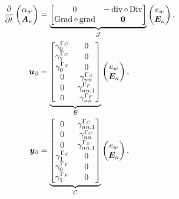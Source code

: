 \begin{equation}\label{eq:phsysKir}
\begin{aligned}
\displaystyle
\diffp{}{t}
\begin{pmatrix}
\alpha_w \\
\bm{A}_{\kappa} \\
\end{pmatrix} &= 
\underbrace{\begin{bmatrix}
	0  &  - \div \circ \Div \\
\Grad \circ \grad & \bm{0} \\
\end{bmatrix}}_{\mathcal{J}}
\begin{pmatrix}
e_w \\
\bm{E}_{\kappa} \\
\end{pmatrix}, \vspace{3pt}\\
\bm{u}_\partial &= \underbrace{
	\begin{bmatrix}
	\gamma_{0}^{\Gamma_C} & {0}  \\
	\gamma_1^{\Gamma_C} &  {0} \\
	\gamma_{0}^{\Gamma_S} &  {0}  \\
	{0} & \gamma_{nn}^{\Gamma_S} \\
	{0} & \gamma_{nn, 1}^{\Gamma_F}  \\
	{0} & \gamma_{nn}^{\Gamma_F}\\
	\end{bmatrix}}_{\mathcal{B}} \begin{pmatrix}
e_w \\
\bm{E}_{\kappa} \\
\end{pmatrix}, \vspace{3pt}\\
\bm{y}_\partial &= \underbrace{
	\begin{bmatrix}
	{0} & \gamma_{nn, 1}^{\Gamma_C} \\
	{0} & \gamma_{nn}^{\Gamma_C} \\
	{0} & \gamma_{nn, 1}^{\Gamma_S} \\
	\gamma_{1}^{\Gamma_S} & {0} \\
	\gamma_{0}^{\Gamma_F} & {0} \\
	\gamma_{1}^{\Gamma_F} & {0} \\
	\end{bmatrix}}_{\mathcal{C}}
\begin{pmatrix}
e_w \\
\bm{E}_{\kappa} \\
\end{pmatrix},
\end{aligned}
\end{equation}
